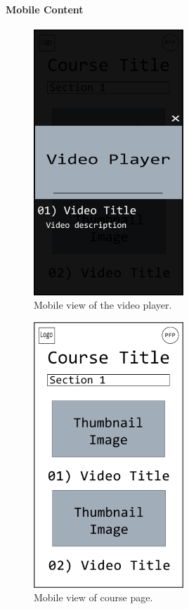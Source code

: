 \documentclass{article}
\begin{document}
\paragraph{Mobile Content}
\vspace{\baselineskip}
\begin{figure}[h!]
    \caption{Mobile view of the video player.}
    \includegraphics[height=10cm]{mobile_course_video}
\end{figure}
\begin{figure}[h!]
    \caption{Mobile view of course page.}
    \includegraphics[height=10cm]{mobile_course_page}
\end{figure}

\clearpage
\end{document}
